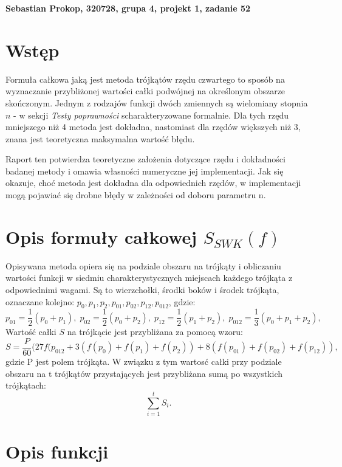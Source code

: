 \documentclass[a4paper,12pt]{article}
\begin{document}
\def\tablename{Tabela} %
\noindent
\textbf{Sebastian Prokop, 320728, grupa 4, projekt 1, zadanie 52}


\section*{Wstęp}
Formuła całkowa jaką jest metoda trójkątów rzędu czwartego to sposób na wyznaczanie przybliżonej wartości całki podwójnej na określonym obszarze skończonym. Jednym z rodzajów funkcji dwóch zmiennych są wielomiany stopnia $n$ - w sekcji \emph{Testy poprawności} scharakteryzowane formalnie. Dla tych rzędu mniejszego niż 4 metoda jest dokładna, nastomiast dla rzędów większych niż 3, znana jest teoretyczna maksymalna wartość błędu.

Raport ten potwierdza teoretyczne założenia dotyczące rzędu i dokładności badanej metody i omawia własności numeryczne jej implementacji. Jak się okazuje, choć metoda jest dokładna dla odpowiednich rzędów, w implementacji mogą pojawiać się drobne błędy w zależności od doboru parametru n. 
\section*{Opis formuły całkowej $S_{SWK} (f)$}
Opisywana metoda opiera się na podziale obszaru na trójkąty i obliczaniu wartości funkcji w siedmiu charakterystycznych miejscach każdego trójkąta z odpowiednimi wagami. Są to wierzchołki, środki boków i środek trójkąta, oznaczane kolejno: $p_0, p_1, p_2, p_{01}, p_{02}, p_{12}, p_{012}$, gdzie:
\[ p_{01} = \frac{1}{2} (p_0 + p_1), \;  p_{02} = \frac{1}{2} (p_0 + p_2), \; p_{12} = \frac{1}{2} (p_1 + p_2), \; p_{012} = \frac{1}{3} (p_0 + p_1 + p_2),\]
Wartość całki $S$ na trójkącie jest przybliżana za pomocą wzoru:
\[  S = \frac{P}{60} (27f(p_{012}+3(f(p_0)+f(p_1)+f(p_2))+8(f(p_{01}) + f(p_{02}) + f(p_{12})), \]
gdzie P jest polem trójkąta.
W związku z tym wartosć całki przy podziale obszaru na t trójkątów przystających jest przybliżana sumą po wszystkich trójkątach:
\[ \sum_{i=1}^{t} S_i. \]

\section*{Opis funkcji}
\end{document}
